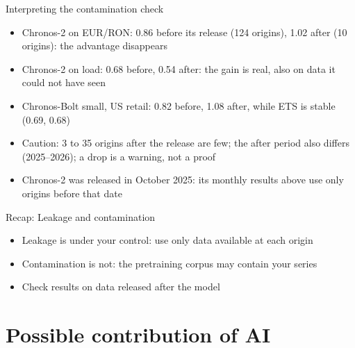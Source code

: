 \begin{frame}{Interpreting the contamination check}
\itemsize{\footnotesize}
\begin{itemize}
    \item Chronos-2 on EUR/RON: 0.86 before its release (124 origins), 1.02 after (10 origins): the advantage disappears
    \item Chronos-2 on load: 0.68 before, 0.54 after: the gain is real, also on data it could not have seen
    \item Chronos-Bolt small, US retail: 0.82 before, 1.08 after, while ETS is stable (0.69, 0.68)
    \item Caution: 3 to 35 origins after the release are few; the after period also differs (2025--2026); a drop is a warning, not a proof
    \item Chronos-2 was released in October 2025: its monthly results above use only origins before that date
\end{itemize}
\end{frame}

\begin{frame}{Recap: Leakage and contamination}
\itemsize{\small}
\begin{itemize}
    \item Leakage is under your control: use only data available at each origin
    \item Contamination is not: the pretraining corpus may contain your series
    \item Check results on data released after the model
\end{itemize}
\end{frame}


\section{Possible contribution of AI}


